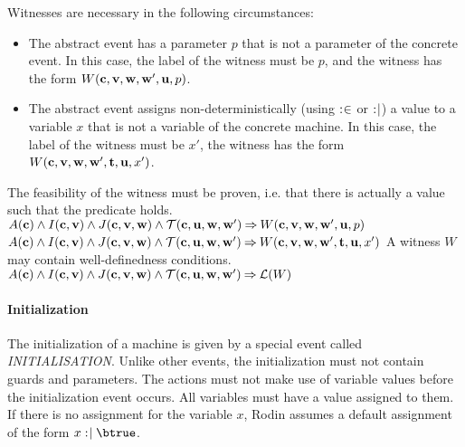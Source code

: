 Witnesses are necessary in the following circumstances:
\begin{itemize}
\item The abstract event has a parameter $p$ that is not a parameter of the concrete  event.
  In this case, the label of the witness must be $p$, and the witness has the form 
  $W(\mathbf{c},{\mathbf{v},\mathbf{w}},\mathbf{w}',\mathbf{u},p)$.
\item The abstract event assigns non-deterministically (using $\mathrel{:\mkern1mu\in}$ or $\mathrel{:\mkern1mu\mid}$) 
  a value to a variable $x$ that is not a variable of the concrete machine.
  In this case, the label of the witness must be $x'$, the witness has the form
  $W(\mathbf{c},{\mathbf{v},\mathbf{w}},\mathbf{w}',{\mathbf{t},\mathbf{u}},x')$.
\end{itemize}

The feasibility of the witness must be proven, i.e. that there is actually a value such that the
 predicate holds.
%
  {$A(\mathbf{c}) \land I(\mathbf{c},\mathbf{v}) \land J(\mathbf{c},{\mathbf{v},\mathbf{w}}) \land
    \mathcal{T}(\mathbf{c},\mathbf{u},\mathbf{w},\mathbf{w}') \mathbin\Rightarrow
    W(\mathbf{c},{\mathbf{v},\mathbf{w}},\mathbf{w}',\mathbf{u},p)$}
%
  {$A(\mathbf{c}) \land I(\mathbf{c},\mathbf{v}) \land J(\mathbf{c},{\mathbf{v},\mathbf{w}}) \land
    \mathcal{T}(\mathbf{c},\mathbf{u},\mathbf{w},\mathbf{w}') \mathbin\Rightarrow
    W(\mathbf{c},{\mathbf{v},\mathbf{w}},\mathbf{w}',{\mathbf{t},\mathbf{u}},x')$}
A witness $W$ may contain well-definedness conditions.
%
  {$A(\mathbf{c}) \land I(\mathbf{c},\mathbf{v}) \land J(\mathbf{c},{\mathbf{v},\mathbf{w}}) \land
    \mathcal{T}(\mathbf{c},\mathbf{u},\mathbf{w},\mathbf{w}') \mathbin\Rightarrow \mathcal{L}(W)$}

\paragraph{Initialization}
The initialization of a machine is given by a special event called \textsl{INITIALISATION}.
Unlike other events, the initialization must not contain guards and parameters.
The actions must not make use of variable values before the initialization event occurs.
All variables must have a value assigned to them. If there is no assignment for the variable $x$, Rodin assumes a default assignment of the form $x\bcmsuch \btrue$.

